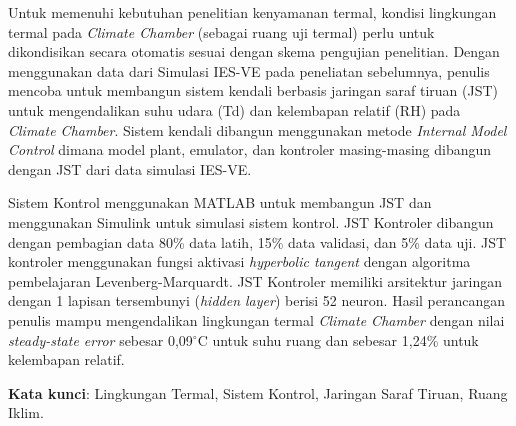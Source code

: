 Untuk memenuhi kebutuhan penelitian kenyamanan termal, kondisi lingkungan termal pada \textit{Climate Chamber} (sebagai ruang uji termal) perlu untuk dikondisikan secara otomatis sesuai dengan skema pengujian penelitian. Dengan menggunakan data dari Simulasi IES-VE pada peneliatan sebelumnya\cite{skripsiIchfan}, penulis mencoba untuk membangun sistem kendali berbasis jaringan saraf tiruan (JST) untuk mengendalikan suhu udara (Td) dan kelembapan relatif (RH) pada \textit{Climate Chamber}. Sistem kendali dibangun menggunakan metode \textit{Internal Model Control} dimana model plant, emulator, dan kontroler masing-masing dibangun dengan JST dari data simulasi IES-VE.

Sistem Kontrol menggunakan MATLAB untuk membangun JST dan menggunakan Simulink untuk simulasi sistem kontrol. JST Kontroler dibangun dengan pembagian data 80\% data latih, 15\% data validasi, dan 5\% data uji. JST kontroler menggunakan fungsi aktivasi \textit{hyperbolic tangent} dengan algoritma pembelajaran Levenberg-Marquardt. JST Kontroler memiliki arsitektur jaringan dengan 1 lapisan tersembunyi (\textit{hidden layer}) berisi 52 neuron. Hasil perancangan penulis mampu mengendalikan lingkungan termal \textit{Climate Chamber} dengan nilai \textit{steady-state error} sebesar 0,09$^\circ$C untuk suhu ruang dan sebesar 1,24\% untuk kelembapan relatif.

\vspace{0.5cm}
\hspace{-1.2cm}
\textbf{Kata kunci}: Lingkungan Termal, Sistem Kontrol, Jaringan Saraf Tiruan, Ruang Iklim.


